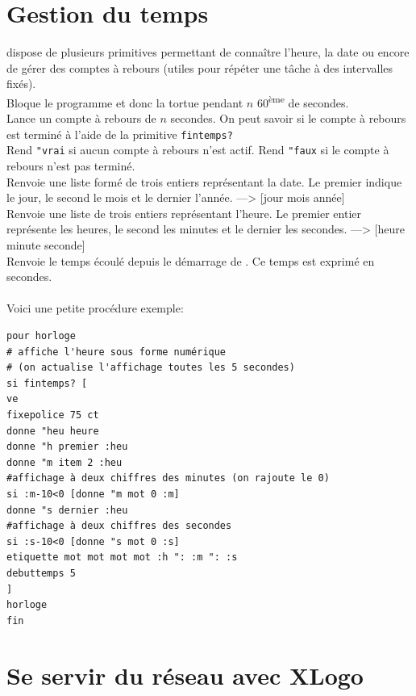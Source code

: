 \section{Gestion du temps}
\xlogo dispose de plusieurs primitives permettant de connaître l'heure, la date ou encore de gérer des comptes à rebours (utiles pour répéter une tâche à des intervalles fixés).\\
 Bloque le programme et donc la tortue pendant $n$ 60\textsuperscript{ème} de secondes.  \\
Lance un compte à rebours de $n$ secondes. On peut savoir si le compte à rebours est terminé à l'aide de la primitive \texttt{fintemps?}\\
Rend \texttt{"vrai} si aucun compte à rebours n'est actif. Rend \texttt{"faux} si le compte à rebours n'est pas terminé.\\
Renvoie une liste formé de trois entiers représentant la date. Le premier indique le jour, le second le mois et le dernier l'année. ---> [jour mois année]\\
Renvoie une liste de trois entiers représentant l'heure. Le premier entier représente les heures, le second les minutes et le dernier les secondes. ---> [heure minute seconde]\\
Renvoie le temps écoulé depuis le démarrage de \xlogo. Ce temps est exprimé en secondes.\\ \\
Voici une petite procédure exemple:
\begin{verbatim}
pour horloge
# affiche l'heure sous forme numérique 
# (on actualise l'affichage toutes les 5 secondes)
si fintemps? [
ve 
fixepolice 75 ct
donne "heu heure
donne "h premier :heu
donne "m item 2 :heu
#affichage à deux chiffres des minutes (on rajoute le 0)
si :m-10<0 [donne "m mot 0 :m]
donne "s dernier :heu
#affichage à deux chiffres des secondes
si :s-10<0 [donne "s mot 0 :s]
etiquette mot mot mot mot :h ": :m ": :s 
debuttemps 5
]
horloge
fin
\end{verbatim} 
\section{Se servir du réseau avec XLogo}
\label{reseau}
